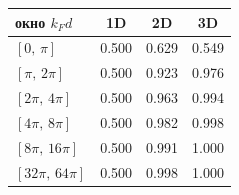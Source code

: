 \begin{tabular}{lccc}\hline
окно $k_Fd$ & 1D & 2D & 3D \\\hline
$[0,\,\pi]$ & 0.500 & 0.629 & 0.549 \\
$[\pi,\,2\pi]$ & 0.500 & 0.923 & 0.976 \\
$[2\pi,\,4\pi]$ & 0.500 & 0.963 & 0.994 \\
$[4\pi,\,8\pi]$ & 0.500 & 0.982 & 0.998 \\
$[8\pi,\,16\pi]$ & 0.500 & 0.991 & 1.000 \\
$[32\pi,\,64\pi]$ & 0.500 & 0.998 & 1.000 \\\hline
\end{tabular}
